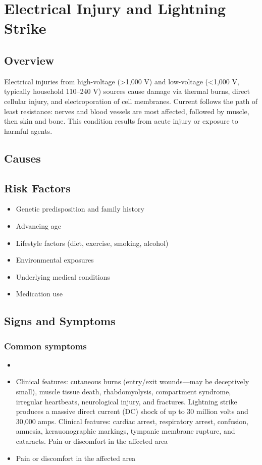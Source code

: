 \chapter{Electrical Injury and Lightning Strike}
\label{sec:Electrical Injury}

\section{Overview}
Electrical injuries from high-voltage (>1,000 V) and low-voltage (<1,000 V, typically household 110--240 V) sources cause damage via thermal burns, direct cellular injury, and electroporation of cell membranes. Current follows the path of least resistance: nerves and blood vessels are most affected, followed by muscle, then skin and bone. This condition results from acute injury or exposure to harmful agents.
\section{Causes}
\section{Risk Factors}

\begin{itemize}[noitemsep]
  \item Genetic predisposition and family history
  \item Advancing age
  \item Lifestyle factors (diet, exercise, smoking, alcohol)
  \item Environmental exposures
  \item Underlying medical conditions
  \item Medication use
\end{itemize}
\section{Signs and Symptoms}

\subsection{Common symptoms}
\begin{itemize}[noitemsep]
  \item \item Clinical features: cutaneous burns (entry/exit wounds---may be deceptively small), muscle tissue death, rhabdomyolysis, compartment syndrome, irregular heartbeats, neurological injury, and fractures. Lightning strike produces a massive direct current (DC) shock of up to 30 million volts and 30,000 amps. Clinical features: cardiac arrest, respiratory arrest, confusion, amnesia, kerauonographic markings, tympanic membrane rupture, and cataracts. Pain or discomfort in the affected area    \item Pain or discomfort in the affected area
  \end{itemize}

